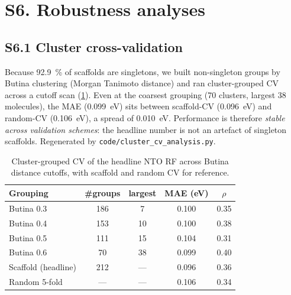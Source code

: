 \documentclass[twoside,twocolumn,9pt]{extarticle}
\begin{document}
\section*{S6. Robustness analyses}

\subsection*{S6.1 Cluster cross-validation}
Because \qty{92.9}{\percent} of scaffolds are singletons, we built non-singleton groups
by Butina clustering (Morgan Tanimoto distance) and ran cluster-grouped CV across a
cutoff scan (\cref{tab:clustercv}). Even at
the coarsest grouping (\num{70} clusters, largest \num{38} molecules), the MAE
(\qty{0.099}{\electronvolt}) sits between scaffold-CV (\qty{0.096}{\electronvolt}) and
random-CV (\qty{0.106}{\electronvolt}), a spread of \qty{0.010}{\electronvolt}. Performance is
therefore \emph{stable across validation schemes}: the headline number is not an artefact of
singleton scaffolds. Regenerated by \texttt{code/cluster\_cv\_analysis.py}.

\begin{table}[htbp]
  \centering
  \caption{Cluster-grouped CV of the headline NTO RF across Butina distance cutoffs,
    with scaffold and random CV for reference.}
  \label{tab:clustercv}
  \footnotesize
  \begin{tabular}{lcccc}
    \toprule
    Grouping & \#groups & largest & MAE (eV) & $\rho$ \\
    \midrule
    Butina 0.3 & 186 & 7  & 0.100 & 0.35 \\
    Butina 0.4 & 153 & 10 & 0.100 & 0.38 \\
    Butina 0.5 & 111 & 15 & 0.104 & 0.31 \\
    Butina 0.6 & 70  & 38 & 0.099 & 0.40 \\
    \midrule
    Scaffold (headline) & 212 & --- & 0.096 & 0.36 \\
    Random 5-fold       & --- & --- & 0.106 & 0.34 \\
    \bottomrule
  \end{tabular}
\end{table}
\end{document}

